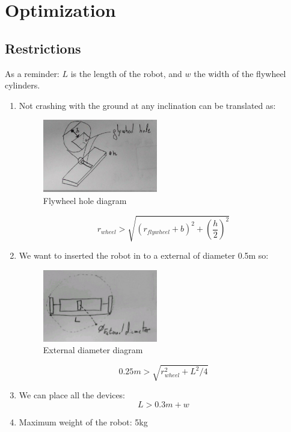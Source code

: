 \section{Optimization}

\subsection{Restrictions}
As a reminder: $L$ is the length of the robot, and $w$ the width of the flywheel cylinders.
\begin{enumerate}
\item Not crashing with the ground at any inclination can be translated as:
\begin{figure}[ht]
	\centering
	\includegraphics[width=5cm]{img/flywheel_hole.jpg}
	\caption{Flywheel hole diagram}
	\label{fig:Flywheel hole diagram}
\end{figure}
\[r_{wheel}> \sqrt{(r_{flywheel} + b)^2+(\frac{h}{2})^2}\]
\item We want to inserted the robot in to a external of diameter 0.5m so:
\begin{figure}[ht]
	\centering
	\includegraphics[width=5cm]{img/external_diameter.jpg}
	\caption{External diameter diagram}
	\label{fig:External diameter diagram}
\end{figure}
\[0.25 m > \sqrt{r_{wheel}^2 + L^2/4}\]
\item We can place all the devices:
\[L > 0.3m + w \]
\item Maximum weight of the robot: 5kg
\end{enumerate}

